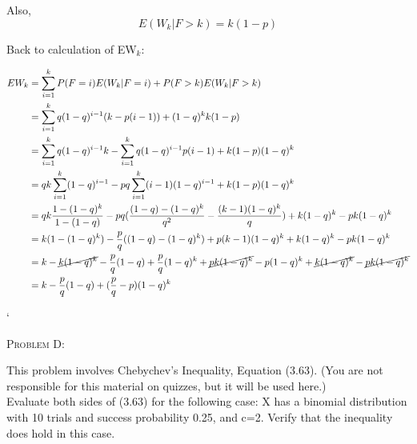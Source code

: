 \documentclass[12pt]{article}
\newenvironment{statement}[1]
{\begin{mdframed}[linewidth=0.6pt]
        \textsc{ #1:}

}
    {\end{mdframed}}
\begin{document}
Also, 
\begin{equation}
E(W_k|F>k) = k(1-p)
\end{equation}

Back to calculation of EW$_k$:

\begin{equation}
\begin{split}
EW_k & = \sum_{i=1}^kP(F=i)E(W_k|F=i) + P(F>k)E(W_k|F>k) \\
     & = \sum_{i=1}^kq(1-q)^{i-1}(k-p(i-1)) + (1-q)^{k}k(1-p) \\
     & = \sum_{i=1}^kq(1-q)^{i-1}k-\sum_{i=1}^kq(1-q)^{i-1}p(i-1) + k(1-p)(1-q)^{k} \\
     & = qk\sum_{i=1}^k(1-q)^{i-1}-pq\sum_{i=1}^k(i-1)(1-q)^{i-1} + k(1-p)(1-q)^{k} \\
     & = qk\frac{1-(1-q)^k}{1-(1-q)}-pq(\frac{(1-q)-(1-q)^k}{q^2}-\frac{(k-1)(1-q)^k}{q})+k(1-q)^k-pk(1-q)^k \\
     & = k(1-(1-q)^k) - \frac{p}{q}((1-q)-(1-q)^k)+p(k-1)(1-q)^k + k(1-q)^k - pk(1-q)^k \\
     & = k - \cancel{k(1-q)^k}  - \frac{p}{q}(1-q) + \frac{p}{q}(1-q)^k + \cancel{pk(1-q)^k} - p(1-q)^k + \cancel{k(1-q)^k}- \cancel{pk(1-q)^k} \\ 
     & = k - \frac{p}{q}(1-q) + (\frac{p}{q}-p)(1-q)^k
\end{split}
\end{equation}



`

\newpage
\begin{statement}{Problem D}
    This problem involves Chebychev's Inequality, Equation (3.63). (You are not responsible for this material on quizzes, but it will be used here.)\\

    Evaluate both sides of (3.63) for the following case: X has a binomial distribution with 10 trials and success probability 0.25, and c=2. Verify that the inequality does hold in this case.
\end{statement}

\end{document}
